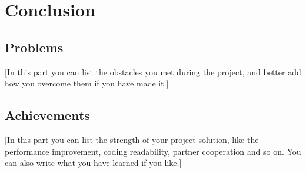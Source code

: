 \documentclass{article}
\begin{document}
\section{Conclusion}

\subsection{Problems}

[In this part you can list the obstacles you met during the project, and better add how you overcome them if you have made it.]

\subsection{Achievements}

[In this part you can list the strength of your project solution, like the performance improvement, coding readability, partner cooperation and so on. You can also write what you have learned if you like.]



\end{document}
